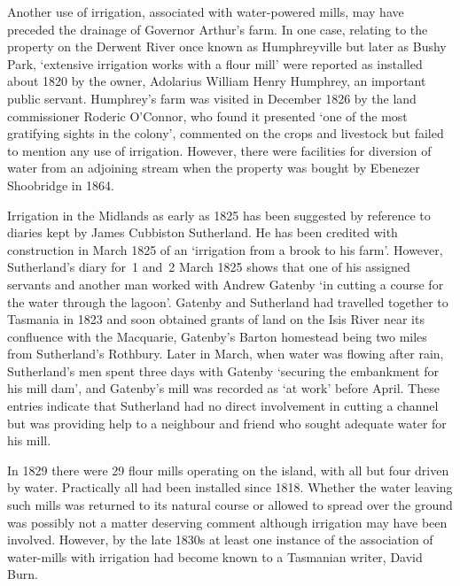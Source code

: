Another use of irrigation, associated with
water-powered mills, may have preceded
the drainage of Governor Arthur's farm.  In one case,
relating to the property on the Derwent River 
once known as Humphrey\-ville but later as Bushy Park, `extensive irrigation works with a flour mill' were
reported as installed about 1820 by the owner, Adolarius William Henry
Humphrey,  an important public servant.
Humphrey's farm was visited in December 1826 by the land commissioner
Roderic O'Connor, who found it presented `one of the most gratifying
sights in the colony', commented on the crops and livestock but failed
to mention any use of irrigation.  However, there were facilities for
diversion of water from an adjoining stream when the property was
bought by Ebenezer Shoobridge in
1864.

Irrigation in the Midlands as early as 1825 has
been suggested by reference to diaries kept by James Cubbiston
Sutherland. He has been credited with
construction in March 1825 of an `irrigation
 from a brook to his farm'. However,
Sutherland's diary for~1 and~2 March 1825 shows that one of his
assigned servants and another man worked with Andrew
Gatenby `in cutting a course for the water through
the lagoon'.  Gatenby and Sutherland had travelled together to
Tasmania in 1823 and soon obtained grants of land on the Isis
River near its confluence with the
Macquarie, Gatenby's Barton homestead being two
miles from Sutherland's Rothbury.  Later in March, when water was
flowing after rain, Sutherland's men spent three days with Gatenby
`securing the embankment for his mill dam', and
Gatenby's mill was recorded as `at work' before April.  These entries
indicate that Sutherland had no direct involvement in cutting a
channel but was providing help to a neighbour and friend who sought
adequate water for his mill.

In 1829 there were 29 flour mills operating on the island, with all
 but four driven by water.  Practically
all had been installed since 1818.  Whether the water leaving such
mills was returned to its natural course or allowed to spread over the
ground was possibly not a matter deserving comment although irrigation
may have been involved. However, by the late 1830s at least one
instance of the association of water-mills with irrigation had become
known to a Tasmanian writer, David Burn.

